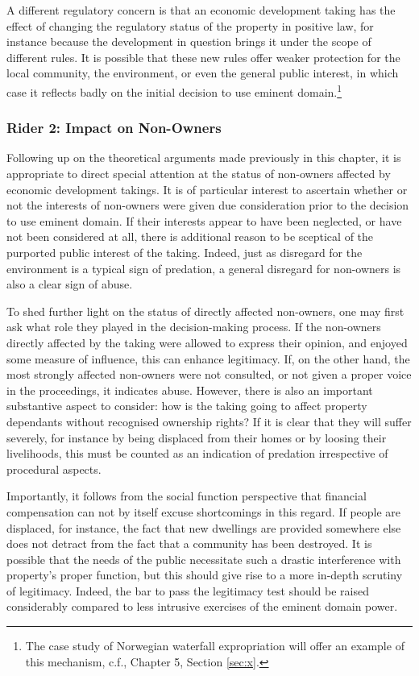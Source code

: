 A different regulatory concern is that an economic development taking has the effect of changing the regulatory status of the property in positive law, for instance because the development in question brings it under the scope of different rules. It is possible that these new rules offer weaker protection for the local community, the environment, or even the general public interest, in which case it reflects badly on the initial decision to use eminent domain.\footnote{The case study of Norwegian waterfall expropriation will offer an example of this mechanism, c.f., Chapter 5, Section \ref{sec:x}.}

\subsubsection*{Rider 2: Impact on Non-Owners}

Following up on the theoretical arguments made previously in this chapter, it is appropriate to direct special attention at the status of non-owners affected by economic development takings. It is of particular interest to ascertain whether or not the interests of non-owners were given due consideration prior to the decision to use eminent domain. If their interests appear to have been neglected, or have not been considered at all, there is additional reason to be sceptical of the purported public interest of the taking. Indeed, just as disregard for the environment is a typical sign of predation, a general disregard for non-owners is also a clear sign of abuse.

To shed further light on the status of directly affected non-owners, one may first ask what role they played in the decision-making process. If the non-owners directly affected by the taking were allowed to express their opinion, and enjoyed some measure of influence, this can enhance legitimacy. If, on the other hand, the most strongly affected non-owners were not consulted, or not given a proper voice in the proceedings, it indicates abuse. However, there is also an important substantive aspect to consider: how is the taking going to affect property dependants without recognised ownership rights? If it is clear that they will suffer severely, for instance by being displaced from their homes or by loosing their livelihoods, this must be counted as an indication of predation irrespective of procedural aspects. 

Importantly, it follows from the social function perspective that financial compensation can not by itself excuse shortcomings in this regard. If people are displaced, for instance, the fact that new dwellings are provided somewhere else does not detract from the fact that a community has been destroyed. It is possible that the needs of the public necessitate such a drastic interference with property's proper function, but this should give rise to a more in-depth scrutiny of legitimacy. Indeed, the bar to pass the legitimacy test should be raised considerably compared to less intrusive exercises of the eminent domain power.

